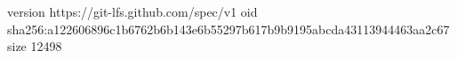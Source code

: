 version https://git-lfs.github.com/spec/v1
oid sha256:a122606896c1b6762b6b143e6b55297b617b9b9195abcda43113944463aa2c67
size 12498
